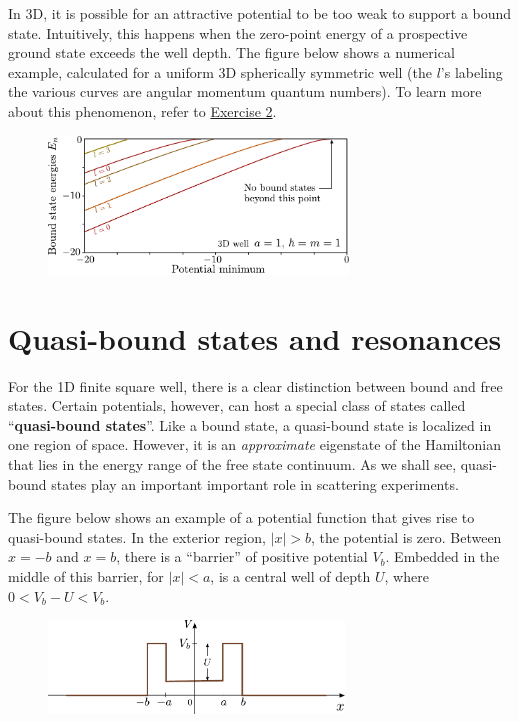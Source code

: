 \documentclass[pra,12pt]{revtex4}
\begin{document}
In 3D, it is possible for an attractive potential to be too weak to
support a bound state.  Intuitively, this happens when the zero-point
energy of a prospective ground state exceeds the well depth.  The
figure below shows a numerical example, calculated for a uniform 3D
spherically symmetric well (the $l$'s labeling the various curves are
angular momentum quantum numbers).  To learn more about this
phenomenon, refer to \hyperref[ex:boundstate3d]{Exercise 2}.

\vskip 0.15in
\begin{figure}[h]
  \centering\includegraphics[width=0.71\textwidth]{boundstate3d}
\end{figure}

\clearpage

\section{Quasi-bound states and resonances}
\label{sec:resonances}

For the 1D finite square well, there is a clear distinction between
bound and free states.  Certain potentials, however, can host a
special class of states called ``\textbf{quasi-bound states}''.  Like
a bound state, a quasi-bound state is localized in one region of
space.  However, it is an \textit{approximate} eigenstate of the
Hamiltonian that lies in the energy range of the free state continuum.
As we shall see, quasi-bound states play an important important role
in scattering experiments.

The figure below shows an example of a potential function that gives
rise to quasi-bound states.  In the exterior region, $|x| > b$, the
potential is zero.  Between $x = -b$ and $x = b$, there is a
``barrier'' of positive potential $V_b$.  Embedded in the middle of
this barrier, for $|x| < a$, is a central well of depth $U$, where $0
< V_b - U < V_b$.

\begin{figure}[h]
  \centering\includegraphics[width=0.7\textwidth]{resonancewell}
\end{figure}
\end{document}
